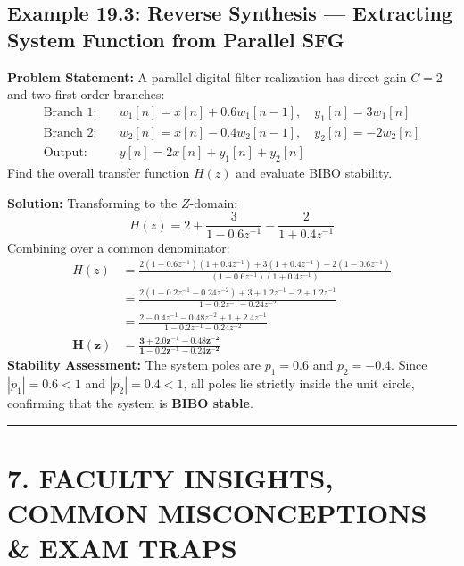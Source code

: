 \documentclass[11pt,a4paper]{article}
\begin{document}
\vspace{0.4cm}
\subsection{Example 19.3: Reverse Synthesis — Extracting System Function from Parallel SFG}
\textbf{Problem Statement:} A parallel digital filter realization has direct gain $C = 2$ and two first-order branches:
\begin{align*}
\text{Branch 1:} \quad & w_1[n] = x[n] + 0.6 w_1[n-1], \quad y_1[n] = 3 w_1[n] \\
\text{Branch 2:} \quad & w_2[n] = x[n] - 0.4 w_2[n-1], \quad y_2[n] = -2 w_2[n] \\
\text{Output:} \quad & y[n] = 2 x[n] + y_1[n] + y_2[n]
\end{align*}
Find the overall transfer function $H(z)$ and evaluate BIBO stability.

\noindent\textbf{Solution:}
Transforming to the $Z$-domain:
\begin{equation}
H(z) = 2 + \frac{3}{1 - 0.6 z^{-1}} - \frac{2}{1 + 0.4 z^{-1}}
\end{equation}
Combining over a common denominator:
\begin{align}
H(z) &= \frac{2(1 - 0.6 z^{-1})(1 + 0.4 z^{-1}) + 3(1 + 0.4 z^{-1}) - 2(1 - 0.6 z^{-1})}{(1 - 0.6 z^{-1})(1 + 0.4 z^{-1})} \nonumber \\
&= \frac{2(1 - 0.2 z^{-1} - 0.24 z^{-2}) + 3 + 1.2 z^{-1} - 2 + 1.2 z^{-1}}{1 - 0.2 z^{-1} - 0.24 z^{-2}} \nonumber \\
&= \frac{2 - 0.4 z^{-1} - 0.48 z^{-2} + 1 + 2.4 z^{-1}}{1 - 0.2 z^{-1} - 0.24 z^{-2}} \nonumber \\
\mathbf{H(z)} &\mathbf{= \frac{3 + 2.0 z^{-1} - 0.48 z^{-2}}{1 - 0.2 z^{-1} - 0.24 z^{-2}}}
\end{align}
\textbf{Stability Assessment:} The system poles are $p_1 = 0.6$ and $p_2 = -0.4$. Since $|p_1| = 0.6 < 1$ and $|p_2| = 0.4 < 1$, all poles lie strictly inside the unit circle, confirming that the system is \textbf{BIBO stable}.

\noindent\rule{\textwidth}{0.5pt}

\section{7. FACULTY INSIGHTS, COMMON MISCONCEPTIONS \& EXAM TRAPS}
\end{document}
